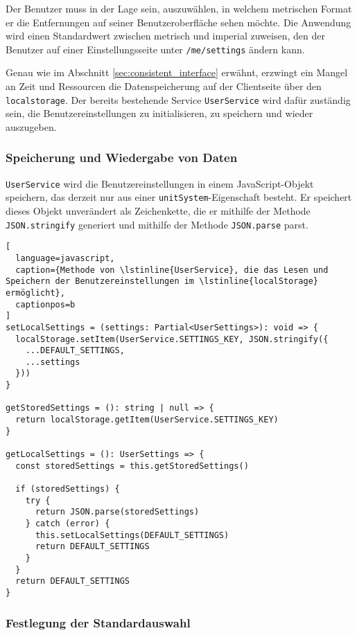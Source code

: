 Der Benutzer muss in der Lage sein, auszuwählen, in welchem metrischen Format er die Entfernungen auf seiner Benutzeroberfläche sehen möchte.
Die Anwendung wird einen Standardwert zwischen metrisch und imperial zuweisen, den der Benutzer auf einer Einstellungsseite unter \lstinline{/me/settings} ändern kann.

Genau wie im Abschnitt \ref{sec:consistent_interface} erwähnt, erzwingt ein Mangel an Zeit und Ressourcen die Datenspeicherung auf der Clientseite über den \lstinline{localstorage}.
Der bereits bestehende Service \lstinline{UserService} wird dafür zuständig sein, die Benutzereinstellungen zu initialisieren, zu speichern und wieder auszugeben.

\subsubsection{Speicherung und Wiedergabe von Daten}

\lstinline{UserService} wird die Benutzereinstellungen in einem JavaScript-Objekt speichern, das derzeit nur aus einer \lstinline{unitSystem}-Eigenschaft besteht.
Er speichert dieses Objekt unverändert als Zeichenkette, die er mithilfe der Methode \lstinline{JSON.stringify} generiert und mithilfe der Methode \lstinline{JSON.parse} parst.

\begin{lstlisting}[
  language=javascript,
  caption={Methode von \lstinline{UserService}, die das Lesen und Speichern der Benutzereinstellungen im \lstinline{localStorage} ermöglicht},
  captionpos=b
]
setLocalSettings = (settings: Partial<UserSettings>): void => {
  localStorage.setItem(UserService.SETTINGS_KEY, JSON.stringify({
    ...DEFAULT_SETTINGS,
    ...settings
  }))
}

getStoredSettings = (): string | null => {
  return localStorage.getItem(UserService.SETTINGS_KEY)
}

getLocalSettings = (): UserSettings => {
  const storedSettings = this.getStoredSettings()

  if (storedSettings) {
    try {
      return JSON.parse(storedSettings)
    } catch (error) {
      this.setLocalSettings(DEFAULT_SETTINGS)
      return DEFAULT_SETTINGS
    }
  }
  return DEFAULT_SETTINGS
}
\end{lstlisting}

\subsubsection{Festlegung der Standardauswahl}

